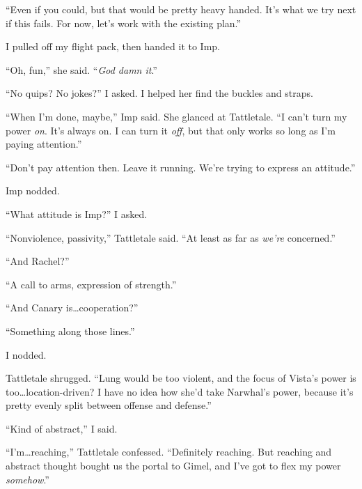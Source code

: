 ``Even if you could, but that would be pretty heavy handed.  It's what we try next if this fails.  For now, let's work with the existing plan.''



I pulled off my flight pack, then handed it to Imp.



``Oh, fun,'' she said.  ``\emph{God damn it}.''



``No quips?  No jokes?''  I asked.  I helped her find the buckles and straps.



``When I'm done, maybe,'' Imp said.  She glanced at Tattletale.  ``I can't turn my power \emph{on}.  It's always on.  I can turn it \emph{off}, but that only works so long as I'm paying attention.''



``Don't pay attention then.  Leave it running.  We're trying to express an attitude.''



Imp nodded.



``What attitude is Imp?'' I asked.



``Nonviolence, passivity,'' Tattletale said.  ``At least as far as \emph{we're} concerned.''



``And Rachel?''



``A call to arms, expression of strength.''



``And Canary is\ldots cooperation?''



``Something along those lines.''



I nodded.



Tattletale shrugged.  ``Lung would be too violent, and the focus of Vista's power is too\ldots location-driven?  I have no idea how she'd take Narwhal's power, because it's pretty evenly split between offense and defense.''



``Kind of abstract,'' I said.



``I'm\ldots reaching,'' Tattletale confessed.  ``Definitely reaching.  But reaching and abstract thought bought us the portal to Gimel, and I've got to flex my power \emph{somehow}.''



